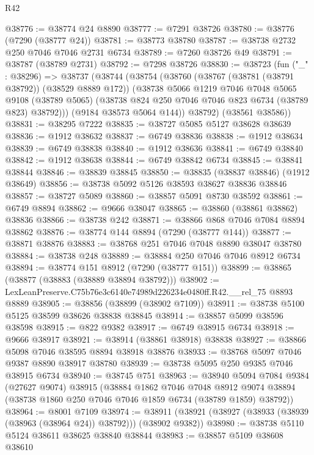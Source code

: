 \begin{lexlean}{R42}
\begin{coremodule}
{@38776 := @38774 @24 @8890
@38777 := @7291 @38726
@38780 := @38776 (@7290 (@38777 @24))
@38781 := @38773 @38780
@38787 := @38738 @2732 @250 @7046 @7046 @2731 @6734
@38789 := @7260 @38726 @49
@38791 := @38787 (@38789 @2731)
@38792 := @7298 @38726
@38830 := @38723
    (fun ("_" : @38296) =>
    @38737
      (@38744
        (@38754
          (@38760
            (@38767 (@38781 (@38791 @38792)) (@38529 @8889 @172))
            (@38738
              @5066
              @1219
              @7046
              @7048
              @5065
              @9108
              (@38789 @5065)
              (@38738 @824 @250 @7046 @7046 @823 @6734 (@38789 @823) @38792)))
          (@9184 @38573 @5064 @144))
        @38792)
      (@38561 @38586))
@38831 := @38295 @7222
@38835 := @38727 @5085 @5127 @38628 @38639
@38836 := @1912 @38632
@38837 := @6749 @38836
@38838 := @1912 @38634
@38839 := @6749 @38838
@38840 := @1912 @38636
@38841 := @6749 @38840
@38842 := @1912 @38638
@38844 := @6749 @38842 @6734
@38845 := @38841 @38844
@38846 := @38839 @38845
@38850 := @38835 (@38837 @38846) (@1912 @38649)
@38856 := @38738 @5092 @5126 @38593 @38627 @38836 @38846
@38857 := @38727 @5089
@38860 := @38857 @5091 @8730 @38592
@38861 := @6749 @8894
@38862 := @9666 @38047
@38865 := @38860 (@38861 @38862) @38836
@38866 := @38738 @242
@38871 := @38866 @868 @7046 @7084 @8894 @38862
@38876 := @38774 @144 @8894 (@7290 (@38777 @144))
@38877 := @38871 @38876
@38883 := @38768 @251 @7046 @7048 @8890 @38047 @38780
@38884 := @38738 @248
@38889 := @38884 @250 @7046 @7046 @8912 @6734
@38894 := @38774 @151 @8912 (@7290 (@38777 @151))
@38899 := @38865 (@38877 (@38883 (@38889 @38894 @38792)))
@38902 := LexLeanPreserve.C75b76e3c6140e74989d226234e0480ff.R42.__rel_75 @8893 @8889
@38905 := @38856 (@38899 (@38902 @7109))
@38911 := @38738 @5100 @5125 @38599 @38626 @38838 @38845
@38914 := @38857 @5099 @38596 @38598
@38915 := @822 @9382
@38917 := @6749 @38915 @6734
@38918 := @9666 @38917
@38921 := @38914 (@38861 @38918) @38838
@38927 := @38866 @5098 @7046 @38595 @8894 @38918 @38876
@38933 := @38768 @5097 @7046 @9387 @8890 @38917 @38780
@38939 := @38738 @5095 @250 @9385 @7046 @38915 @6734
@38940 := @38745 @751
@38963 := @38940
    @5094
    @7084
    @9384
    (@27627 @9074)
    @38915
    (@38884
      @1862
      @7046
      @7048
      @8912
      @9074
      @38894
      (@38738 @1860 @250 @7046 @7046 @1859 @6734 (@38789 @1859) @38792))
@38964 := @8001 @7109
@38974 := @38911 (@38921 (@38927 (@38933 (@38939 (@38963 (@38964 @24)) @38792))) (@38902 @9382))
@38980 := @38738 @5110 @5124 @38611 @38625 @38840 @38844
@38983 := @38857 @5109 @38608 @38610
}
\end{coremodule}
\end{lexlean}
